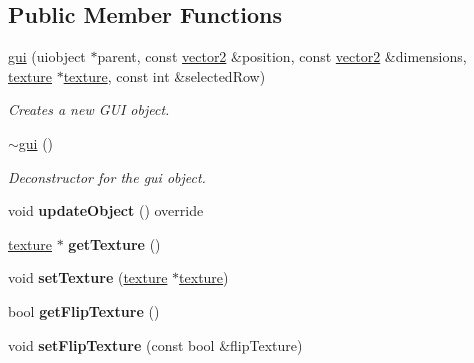 \subsection*{Public Member Functions}
\begin{DoxyCompactItemize}
\item 
\hyperlink{classflounder_1_1gui_a95658ab4bcf45269d6d0c852a913c85d}{gui} (uiobject $\ast$parent, const \hyperlink{classflounder_1_1vector2}{vector2} \&position, const \hyperlink{classflounder_1_1vector2}{vector2} \&dimensions, \hyperlink{classflounder_1_1texture}{texture} $\ast$\hyperlink{classflounder_1_1texture}{texture}, const int \&selected\+Row)
\begin{DoxyCompactList}\small\item\em Creates a new G\+UI object. \end{DoxyCompactList}\item 
\hyperlink{classflounder_1_1gui_ab956f28a5e730f928a48490255346787}{$\sim$gui} ()
\begin{DoxyCompactList}\small\item\em Deconstructor for the gui object. \end{DoxyCompactList}\item 
\mbox{\label{classflounder_1_1gui_a4ab9fe21b6a34200aa8b79b0008332b2}} 
void {\bfseries update\+Object} () override
\item 
\mbox{\label{classflounder_1_1gui_afadb039858588ff99dd4d236d22833ab}} 
\hyperlink{classflounder_1_1texture}{texture} $\ast$ {\bfseries get\+Texture} ()
\item 
\mbox{\label{classflounder_1_1gui_acb02288e8176c842ffdb0123561d993d}} 
void {\bfseries set\+Texture} (\hyperlink{classflounder_1_1texture}{texture} $\ast$\hyperlink{classflounder_1_1texture}{texture})
\item 
\mbox{\label{classflounder_1_1gui_ad767ee1ea49f217abce7533973d862a9}} 
bool {\bfseries get\+Flip\+Texture} ()
\item 
\mbox{\label{classflounder_1_1gui_a0099ff0cbb0e3c9a4b227160043f1fc3}} 
void {\bfseries set\+Flip\+Texture} (const bool \&flip\+Texture)
\item 
\mbox{\label{classflounder_1_1gui_a09e7d3428923dd2c6b1f71d6275c3b2c}} 

\end{DoxyCompactItemize}
